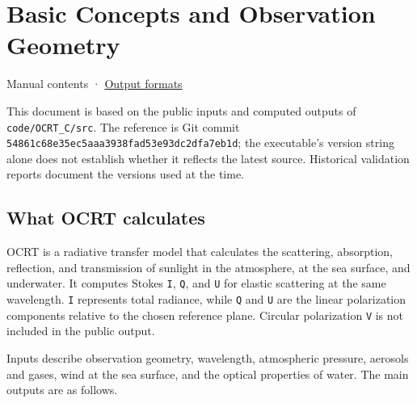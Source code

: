 \chapter{Basic Concepts and Observation Geometry}
\label{chap:01_concepts_geometry}
Manual contents · \hyperref[chap:05_output_formats]{Output formats}

This document is based on the public inputs and computed outputs of \texttt{code/\allowbreak{}OCRT\_\allowbreak{}C/\allowbreak{}src}. The reference is Git commit \texttt{54861c68e35ec5aa\allowbreak{}a3938fad53e93dc2\allowbreak{}dfa7eb1d}; the executable's version string alone does not establish whether it reflects the latest source. Historical validation reports document the versions used at the time.

\section{What OCRT calculates}
\label{sec:auto:01_concepts_geometry:1}
OCRT is a radiative transfer model that calculates the scattering, absorption, reflection, and transmission of sunlight in the atmosphere, at the sea surface, and underwater. It computes Stokes \texttt{I}, \texttt{Q}, and \texttt{U} for elastic scattering at the same wavelength. \texttt{I} represents total radiance, while \texttt{Q} and \texttt{U} are the linear polarization components relative to the chosen reference plane. Circular polarization \texttt{V} is not included in the public output.

Inputs describe observation geometry, wavelength, atmospheric pressure, aerosols and gases, wind at the sea surface, and the optical properties of water. The main outputs are as follows.


